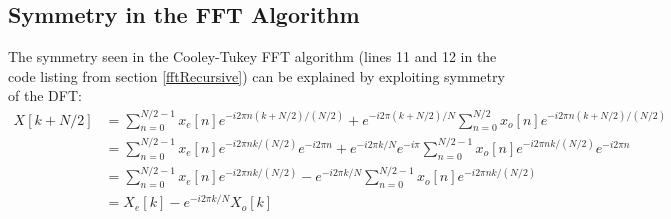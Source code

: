 \subsection{Symmetry in the FFT Algorithm}
\label{fftSymmetry}
The symmetry seen in the Cooley-Tukey FFT algorithm (lines 11 and 12 in the code listing from section \ref{fftRecursive}) can be explained by exploiting symmetry of the DFT:
\begin{align*}
X[k+N/2] &= \sum_{n=0}^{N/2-1}x_e[n]e^{-i2\pi n (k+N/2) /(N/2)} + e^{-i2\pi (k+N/2)/N}\sum_{n=0}^{N/2}x_o[n]e^{-i2\pi n (k+N/2) /(N/2)}\\
&=\sum_{n=0}^{N/2-1}x_e[n]e^{-i2\pi n k/(N/2)}e^{-i2\pi n} + e^{-i2\pi k/N}e^{-i\pi}\sum_{n=0}^{N/2-1}x_o[n]e^{-i2\pi n k/(N/2)}e^{-i2\pi n}\\
&= \sum_{n=0}^{N/2-1}x_e[n]e^{-i2\pi n k/(N/2)} - e^{-i2\pi k/N}\sum_{n=0}^{N/2-1}x_o[n]e^{-i2\pi n k/(N/2)}\\
&= X_e[k] - e^{-i2\pi k/N}X_o[k]
\end{align*}